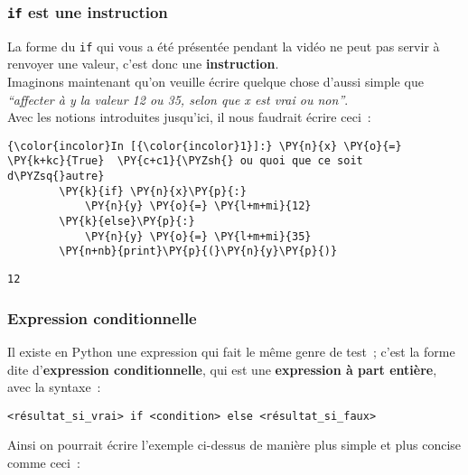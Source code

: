     \hypertarget{if-est-une-instruction}{%
\subsubsection{\texorpdfstring{\texttt{if} est une
instruction}{if est une instruction}}\label{if-est-une-instruction}}

    La forme du \texttt{if} qui vous a été présentée pendant la vidéo ne
peut pas servir à renvoyer une valeur, c'est donc une
\textbf{instruction}.\\

    Imaginons maintenant qu'on veuille écrire quelque chose d'aussi simple
que \emph{``affecter à y la valeur 12 ou 35, selon que x est vrai ou
non''}.\\

    Avec les notions introduites jusqu'ici, il nous faudrait écrire ceci~:

    \begin{Verbatim}[commandchars=\\\{\}]
{\color{incolor}In [{\color{incolor}1}]:} \PY{n}{x} \PY{o}{=} \PY{k+kc}{True}  \PY{c+c1}{\PYZsh{} ou quoi que ce soit d\PYZsq{}autre}
        \PY{k}{if} \PY{n}{x}\PY{p}{:}
            \PY{n}{y} \PY{o}{=} \PY{l+m+mi}{12}
        \PY{k}{else}\PY{p}{:}
            \PY{n}{y} \PY{o}{=} \PY{l+m+mi}{35}
        \PY{n+nb}{print}\PY{p}{(}\PY{n}{y}\PY{p}{)}
\end{Verbatim}


    \begin{Verbatim}[commandchars=\\\{\}]
12

    \end{Verbatim}

    \hypertarget{expression-conditionnelle}{%
\subsubsection{Expression
conditionnelle}\label{expression-conditionnelle}}

    Il existe en Python une expression qui fait le même genre de test~;
c'est la forme dite d'\textbf{expression conditionnelle}, qui est une
\textbf{expression à part entière}, avec la syntaxe~:

\begin{verbatim}
<résultat_si_vrai> if <condition> else <résultat_si_faux> 
\end{verbatim}

    Ainsi on pourrait écrire l'exemple ci-dessus de manière plus simple et
plus concise comme ceci~:


